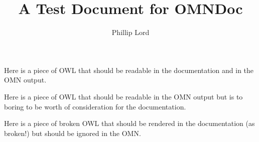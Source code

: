 \documentclass{article}
\title{A Test Document for OMNDoc}
\author{Phillip Lord}
\begin{document}
\maketitle

Here is a piece of OWL that should be readable in the documentation and in the
OMN output. 



Here is a piece of OWL that should be readable in the OMN output but is to
boring to be worth of consideration for the documentation. 



Here is a piece of broken OWL that should be rendered in the documentation (as
broken!) but should be ignored in the OMN. 


\end{document}
